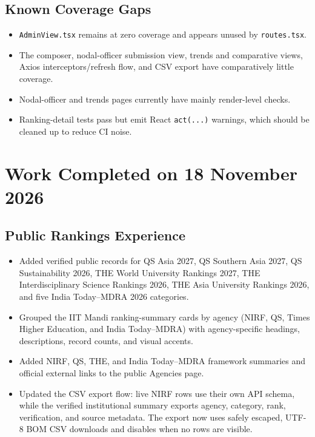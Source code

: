 \documentclass[11pt,a4paper]{article}
\begin{document}
\subsection*{Known Coverage Gaps}
\begin{itemize}[leftmargin=1.4em,itemsep=2pt]
  \item \texttt{AdminView.tsx} remains at zero coverage and appears unused by \texttt{routes.tsx}.
  \item The composer, nodal-officer submission view, trends and comparative views, Axios interceptors/refresh flow, and CSV export have comparatively little coverage.
  \item Nodal-officer and trends pages currently have mainly render-level checks.
  \item Ranking-detail tests pass but emit React \texttt{act(...)} warnings, which should be cleaned up to reduce CI noise.
\end{itemize}

\section*{Work Completed on 18 November 2026}
\subsection*{Public Rankings Experience}
\begin{itemize}[leftmargin=1.4em,itemsep=2pt]
  \item Added verified public records for QS Asia 2027, QS Southern Asia 2027, QS Sustainability 2026, THE World University Rankings 2027, THE Interdisciplinary Science Rankings 2026, THE Asia University Rankings 2026, and five India Today--MDRA 2026 categories.
  \item Grouped the IIT Mandi ranking-summary cards by agency (NIRF, QS, Times Higher Education, and India Today--MDRA) with agency-specific headings, descriptions, record counts, and visual accents.
  \item Added NIRF, QS, THE, and India Today--MDRA framework summaries and official external links to the public Agencies page.
  \item Updated the CSV export flow: live NIRF rows use their own API schema, while the verified institutional summary exports agency, category, rank, verification, and source metadata. The export now uses safely escaped, UTF-8 BOM CSV downloads and disables when no rows are visible.
\end{itemize}
\end{document}

